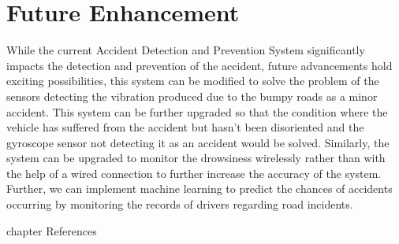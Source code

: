 \documentclass[12pt,a4paper]{report}
\begin{document}
\section{Future Enhancement}
\begin{justify}
    While the current Accident Detection and Prevention System significantly impacts the detection and prevention of the accident, future advancements hold exciting possibilities, this system can be modified to solve the problem of the sensors detecting the vibration produced due to the bumpy roads as a minor accident. This system can be further upgraded so that the condition where the vehicle has suffered from the accident but hasn't been disoriented and the gyroscope sensor not detecting it as an accident would be solved. Similarly, the system can be upgraded to monitor the drowsiness wirelessly rather than with the help of a wired connection to further increase the accuracy of the system. Further, we can implement machine learning to predict the chances of accidents occurring by monitoring the records of drivers regarding road incidents.
\end{justify}
	\pagebreak
	 {chapter} {References}	
\end{document}
